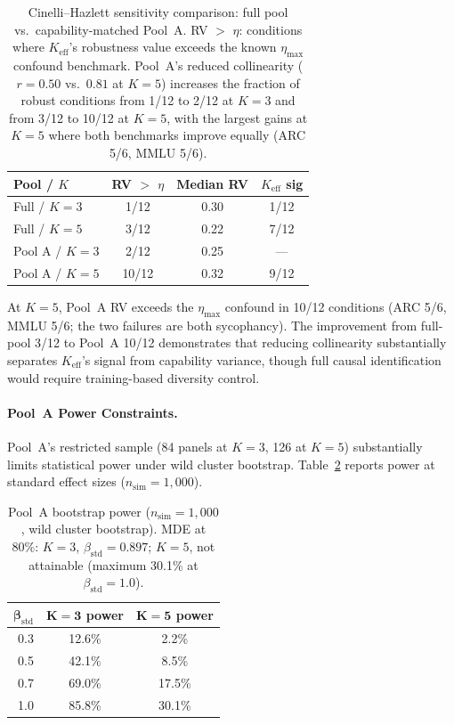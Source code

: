 \begin{table}[h]
\centering
\small
\caption{Cinelli--Hazlett sensitivity comparison: full pool vs.\ capability-matched Pool~A. RV $>$ $\eta$: conditions where $K_{\mathrm{eff}}$'s robustness value exceeds the known $\eta_{\max}$ confound benchmark. Pool~A's reduced collinearity ($r{=}0.50$ vs.\ $0.81$ at $K{=}5$) increases the fraction of robust conditions from 1/12 to 2/12 at $K{=}3$ and from 3/12 to 10/12 at $K{=}5$, with the largest gains at $K{=}5$ where both benchmarks improve equally (ARC 5/6, MMLU 5/6).}
\label{tab:sensitivity_poolA}
\begin{tabular}{lccc}
\toprule
\textbf{Pool / $K$} & \textbf{RV $>$ $\eta$} & \textbf{Median RV} & \textbf{$K_{\mathrm{eff}}$ sig} \\
\midrule
Full / $K{=}3$ & 1/12 & 0.30 & 1/12 \\
Full / $K{=}5$ & 3/12 & 0.22 & 7/12 \\
Pool A / $K{=}3$ & 2/12 & 0.25 & --- \\
Pool A / $K{=}5$ & 10/12 & 0.32 & 9/12 \\
\bottomrule
\end{tabular}
\end{table}

At $K{=}5$, Pool~A RV exceeds the $\eta_{\max}$ confound in 10/12 conditions (ARC 5/6, MMLU 5/6; the two failures are both sycophancy). The improvement from full-pool 3/12 to Pool~A 10/12 demonstrates that reducing collinearity substantially separates $K_{\mathrm{eff}}$'s signal from capability variance, though full causal identification would require training-based diversity control.

\paragraph{Pool~A Power Constraints.}
Pool~A's restricted sample (84 panels at $K{=}3$, 126 at $K{=}5$) substantially limits statistical power under wild cluster bootstrap. Table~\ref{tab:poolA_power} reports power at standard effect sizes ($n_{\mathrm{sim}}{=}1{,}000$).

\begin{table}[h]
\centering
\small
\caption{Pool~A bootstrap power ($n_{\mathrm{sim}}{=}1{,}000$, wild cluster bootstrap). MDE at 80\%: $K{=}3$, $\beta_{\mathrm{std}}{=}0.897$; $K{=}5$, not attainable (maximum 30.1\% at $\beta_{\mathrm{std}}{=}1.0$).}
\label{tab:poolA_power}
\begin{tabular}{rcc}
\toprule
$\boldsymbol{\beta_{\mathrm{std}}}$ & $\boldsymbol{K{=}3}$ \textbf{power} & $\boldsymbol{K{=}5}$ \textbf{power} \\
\midrule
0.3 & 12.6\% & 2.2\% \\
0.5 & 42.1\% & 8.5\% \\
0.7 & 69.0\% & 17.5\% \\
1.0 & 85.8\% & 30.1\% \\
\bottomrule
\end{tabular}
\end{table}


